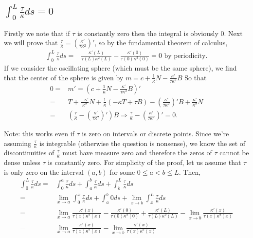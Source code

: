 \documentclass[12pt]{amsart}
\begin{document}
\subsection{$\int_0^L\frac{\tau}{\kappa}ds=0$}
Firstly we note that if $\tau$ is constantly zero then the integral is obviously 0. Next we will prove that $\frac{\tau}{\kappa}=\left(\frac{\kappa'}{\tau\kappa^2}\right)'$, so by the fundamental theorem of calculus,
\begin{align*}
	\int_0^L\frac{\tau}{\kappa}ds=&\frac{\kappa'(L)}{\tau(L)\kappa^2(L)}-\frac{\kappa'(0)}{\tau(0)\kappa^2(0)}=0 \text{ by periodicity}.
\end{align*}
If we consider the oscillating sphere (which must be the same sphere), we find that the center of the sphere is given by $m=c+\frac{1}{\kappa}N-\frac{\kappa'}{\tau\kappa^2}B$ So that
\begin{align*}
	0=&m'=(c+\frac{1}{\kappa}N-\frac{\kappa'}{\tau\kappa^2}B)'
	\\=&T+\frac{-\kappa'}{\kappa^2}N+\frac{1}{\kappa}\left(-\kappa T+\tau B\right)-\left(\frac{\kappa'}{\tau\kappa^2}\right)'B+\frac{\kappa'}{\kappa^2}N
	\\=&\left(\frac{\tau}{\kappa}-\left(\frac{\kappa'}{\tau\kappa^2}\right)'\right)B\Rightarrow\frac{\tau}{\kappa}-\left(\frac{\kappa'}{\tau\kappa^2}\right)'=0.
\end{align*}
\begin{comment}
Just in case, let us prove that the oscillating sphere has center $m=c+\frac{1}{\kappa}N-\frac{\kappa'}{\tau\kappa^2}B$. Well, we want the sphere to have a point of contact of third order.
\end{comment}
Note: this works even if $\tau$ is zero on intervals or discrete points. Since we're assuming $\frac{\tau}{\kappa}$ is integrable (otherwise the question is nonsense), we know the set of discontinuities of $\frac{\tau}{\kappa}$ must have measure zero and therefore the zeros of $\tau$ cannot be dense unless $\tau$ is constantly zero. For simplicity of the proof, let us assume that $\tau$ is only zero on the interval $(a,b)$ for some $0\leq a<b\leq L$. Then, 
\begin{align*}
	\int_0^L\frac{\tau}{\kappa}ds=&\int_0^a\frac{\tau}{\kappa}ds+\int_a^b\frac{\tau}{\kappa}ds+\int_b^L\frac{\tau}{\kappa}ds
	\\=&\lim\limits_{x\to a}\int_0^x\frac{\tau}{\kappa}ds+\int_a^b0ds+\lim\limits_{x\to b}\int_x^L\frac{\tau}{\kappa}ds
	\\=&\lim\limits_{x\to a}\frac{\kappa'(x)}{\tau(x)\kappa^2(x)}-\frac{\kappa'(0)}{\tau(0)\kappa^2(0)}+\frac{\kappa'(L)}{\tau(L)\kappa^2(L)}-\lim\limits_{x\to b}\frac{\kappa'(x)}{\tau(x)\kappa^2(x)}
	\\=&\lim\limits_{x\to a}\frac{\kappa'(x)}{\tau(x)\kappa^2(x)}-\lim\limits_{x\to b}\frac{\kappa'(x)}{\tau(x)\kappa^2(x)}
\end{align*}
\end{document}
